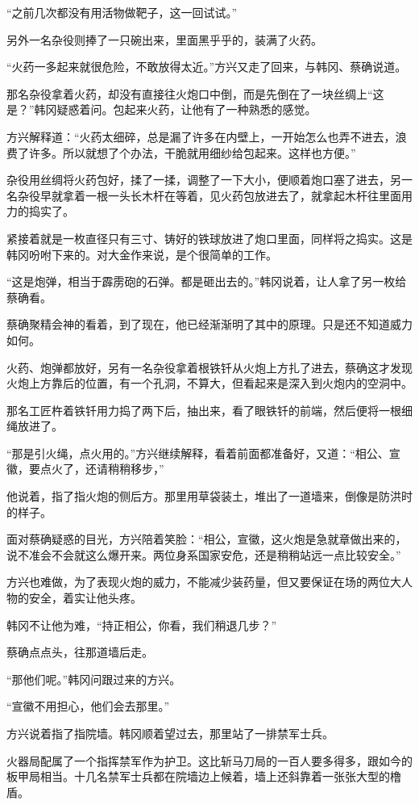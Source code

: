 “之前几次都没有用活物做靶子，这一回试试。”

另外一名杂役则捧了一只碗出来，里面黑乎乎的，装满了火药。

“火药一多起来就很危险，不敢放得太近。”方兴又走了回来，与韩冈、蔡确说道。

那名杂役拿着火药，却没有直接往火炮口中倒，而是先倒在了一块丝绸上“这是？”韩冈疑惑着问。包起来火药，让他有了一种熟悉的感觉。

方兴解释道：“火药太细碎，总是漏了许多在内壁上，一开始怎么也弄不进去，浪费了许多。所以就想了个办法，干脆就用细纱给包起来。这样也方便。”

杂役用丝绸将火药包好，揉了一揉，调整了一下大小，便顺着炮口塞了进去，另一名杂役早就拿着一根一头长木杆在等着，见火药包放进去了，就拿起木杆往里面用力的捣实了。

紧接着就是一枚直径只有三寸、铸好的铁球放进了炮口里面，同样将之捣实。这是韩冈吩咐下来的。对大金作来说，是个很简单的工作。

“这是炮弹，相当于霹雳砲的石弹。都是砸出去的。”韩冈说着，让人拿了另一枚给蔡确看。

蔡确聚精会神的看着，到了现在，他已经渐渐明了其中的原理。只是还不知道威力如何。

火药、炮弹都放好，另有一名杂役拿着根铁钎从火炮上方扎了进去，蔡确这才发现火炮上方靠后的位置，有一个孔洞，不算大，但看起来是深入到火炮内的空洞中。

那名工匠杵着铁钎用力捣了两下后，抽出来，看了眼铁钎的前端，然后便将一根细绳放进了。

“那是引火绳，点火用的。”方兴继续解释，看着前面都准备好，又道：“相公、宣徽，要点火了，还请稍稍移步，”

他说着，指了指火炮的侧后方。那里用草袋装土，堆出了一道墙来，倒像是防洪时的样子。

面对蔡确疑惑的目光，方兴陪着笑脸：“相公，宣徽，这火炮是急就章做出来的，说不准会不会就这么爆开来。两位身系国家安危，还是稍稍站远一点比较安全。”

方兴也难做，为了表现火炮的威力，不能减少装药量，但又要保证在场的两位大人物的安全，着实让他头疼。

韩冈不让他为难，“持正相公，你看，我们稍退几步？”

蔡确点点头，往那道墙后走。

“那他们呢。”韩冈问跟过来的方兴。

“宣徽不用担心，他们会去那里。”

方兴说着指了指院墙。韩冈顺着望过去，那里站了一排禁军士兵。

火器局配属了一个指挥禁军作为护卫。这比斩马刀局的一百人要多得多，跟如今的板甲局相当。十几名禁军士兵都在院墙边上候着，墙上还斜靠着一张张大型的橹盾。

